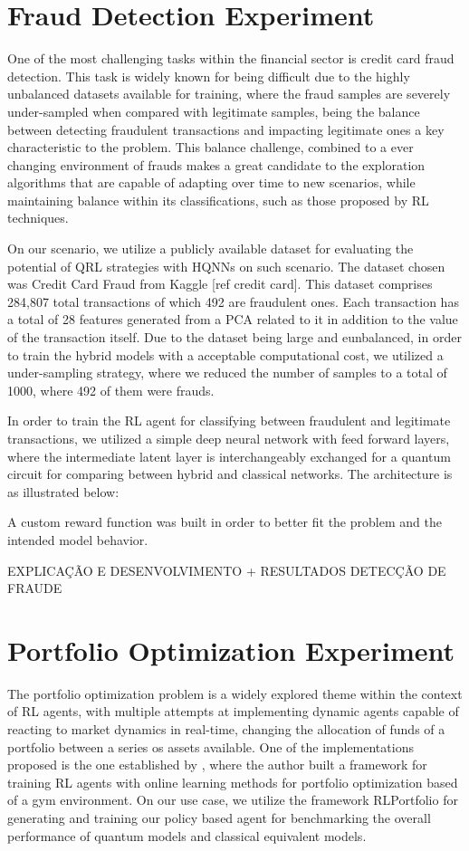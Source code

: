 \section{Fraud Detection Experiment}

One of the most challenging tasks within the financial sector is credit card fraud detection. This task is widely known for being difficult due to the highly unbalanced datasets available for training, where the fraud samples are severely under-sampled when compared with legitimate samples, being the balance between detecting fraudulent transactions and impacting legitimate ones a key characteristic to the problem. This balance challenge, combined to a ever changing environment of frauds makes a great candidate to the exploration algorithms that are capable of adapting over time to new scenarios, while maintaining balance within its classifications, such as those proposed by RL techniques.

On our scenario, we utilize a publicly available dataset for evaluating the potential of QRL strategies with HQNNs on such scenario. The dataset chosen was Credit Card Fraud from Kaggle [ref credit card]. This dataset comprises 284,807 total transactions of which 492 are fraudulent ones. Each transaction has a total of 28 features generated from a PCA related to it in addition to the value of the transaction itself. Due to the dataset being large and eunbalanced, in order to train the hybrid models with a acceptable computational cost, we utilized a under-sampling strategy, where we reduced the number of samples to a total of 1000, where 492 of them were frauds.

In order to train the RL agent for classifying between fraudulent and legitimate transactions, we utilized a simple deep neural network with feed forward layers, where the intermediate latent layer is interchangeably exchanged for a quantum circuit for comparing between hybrid and classical networks. The architecture is as illustrated below:


A custom reward function was built in order to better fit the problem and the intended model behavior.


EXPLICAÇÃO E DESENVOLVIMENTO + RESULTADOS DETECÇÃO DE FRAUDE


\section{Portfolio Optimization Experiment}
The portfolio optimization problem is a widely explored theme within the context of RL agents, with multiple attempts at implementing dynamic agents capable of reacting to market dynamics in real-time, changing the allocation of funds of a portfolio between a series os assets available. One of the implementations proposed is the one established by \cite{RLportfolio}, where the author built a framework for training RL agents with online learning methods for portfolio optimization based of a gym environment.
On our use case, we utilize the framework RLPortfolio \cite{RLportfolio} for generating and training our policy based agent for benchmarking the overall performance of quantum models and classical equivalent models.

